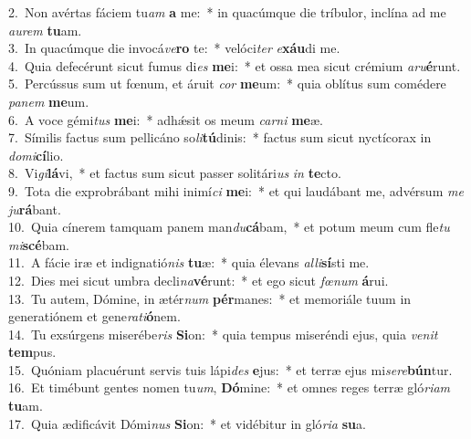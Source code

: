 {2.~}Non avértas fáciem tu\textit{am} \textbf{a} me:~* in quacúmque die tríbulor, inclína ad me \textit{au}\textit{rem} \textbf{tu}am.\\
{3.~}In quacúmque die invocá\textit{ve}\textbf{ro} te:~* velóci\textit{ter} \textit{e}\textbf{xáu}di me.\\
{4.~}Quia defecérunt sicut fumus di\textit{es} \textbf{me}i:~* et ossa mea sicut crémium \textit{a}\textit{ru}\textbf{é}runt.\\
{5.~}Percússus sum ut fœnum, et áruit \textit{cor} \textbf{me}um:~* quia oblítus sum comédere \textit{pa}\textit{nem} \textbf{me}um.\\
{6.~}A voce gémi\textit{tus} \textbf{me}i:~* adhǽsit os meum \textit{car}\textit{ni} \textbf{me}æ.\\
{7.~}Símilis factus sum pellicáno so\textit{li}\textbf{tú}dinis:~* factus sum sicut nyctícorax in \textit{do}\textit{mi}\textbf{cí}lio.\\
{8.~}Vi\textit{gi}\textbf{lá}vi,~* et factus sum sicut passer solitári\textit{us} \textit{in} \textbf{te}cto.\\
{9.~}Tota die exprobrábant mihi inimí\textit{ci} \textbf{me}i:~* et qui laudábant me, advérsum \textit{me} \textit{ju}\textbf{rá}bant.\\
{10.~}Quia cínerem tamquam panem man\textit{du}\textbf{cá}bam,~* et potum meum cum fle\textit{tu} \textit{mi}\textbf{scé}bam.\\
{11.~}A fácie iræ et indignatió\textit{nis} \textbf{tu}æ:~* quia élevans \textit{al}\textit{li}\textbf{sí}sti me.\\
{12.~}Dies mei sicut umbra decli\textit{na}\textbf{vé}runt:~* et ego sicut \textit{fœ}\textit{num} \textbf{á}rui.\\
{13.~}Tu autem, Dómine, in ætér\textit{num} \textbf{pér}manes:~* et memoriále tuum in generatiónem et gene\textit{ra}\textit{ti}\textbf{ó}nem.\\
{14.~}Tu exsúrgens miserébe\textit{ris} \textbf{Si}on:~* quia tempus miseréndi ejus, quia \textit{ve}\textit{nit} \textbf{tem}pus.\\
{15.~}Quóniam placuérunt servis tuis lápi\textit{des} \textbf{e}jus:~* et terræ ejus mi\textit{se}\textit{re}\textbf{bún}tur.\\
{16.~}Et timébunt gentes nomen tu\textit{um}, \textbf{Dó}mine:~* et omnes reges terræ gló\textit{ri}\textit{am} \textbf{tu}am.\\
{17.~}Quia ædificávit Dómi\textit{nus} \textbf{Si}on:~* et vidébitur in gló\textit{ri}\textit{a} \textbf{su}a.\\
